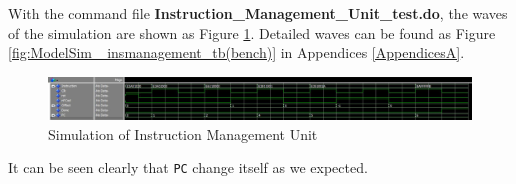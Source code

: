With the command file \textbf{Instruction\_Management\_Unit\_test.do}, the waves of the simulation are shown as Figure \ref{fig:IMUres}. Detailed waves can be found as Figure \ref{fig:ModelSim_ insmanagement_tb(bench)} in Appendices \ref{AppendicesA}.

\begin{figure}[htp]
    \centering
    \includegraphics[width=1\textwidth]{picture/IMUres.jpg}
    \caption{Simulation of Instruction Management Unit}     
    \label{fig:IMUres}
\end{figure}

It can be seen clearly that \texttt{PC} change itself as we expected.

